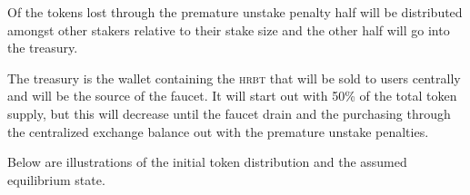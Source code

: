 \documentclass[
  11.5pt,
  a4paper,
  USenglish
]{article}
\begin{document}
Of the tokens lost through the premature unstake penalty half will be distributed amongst other stakers relative to their stake size and the other half will go into the treasury.

The treasury is the wallet containing the \textsc{hrbt} that will be sold to users centrally and will be the source of the faucet.
It will start out with 50\% of the total token supply, but this will decrease until the faucet drain and the purchasing through the centralized exchange balance out with the premature unstake penalties.

Below are illustrations of the initial token distribution and the assumed equilibrium state.
\begin{center}
\end{center}
\end{document}
